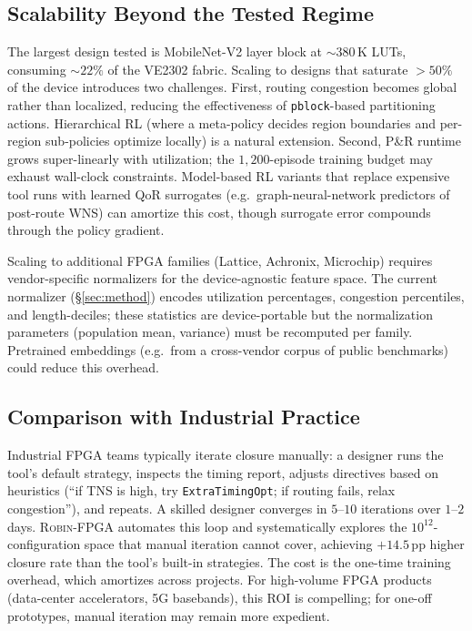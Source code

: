 \documentclass[journal,onecolumn=false]{IEEEtran}
\begin{document}
\subsection{Scalability Beyond the Tested Regime}

The largest design tested is MobileNet-V2 layer block at ${\sim}380$\,K LUTs, consuming ${\sim}22\%$ of the VE2302 fabric. Scaling to designs that saturate $>50\%$ of the device introduces two challenges. First, routing congestion becomes global rather than localized, reducing the effectiveness of \texttt{pblock}-based partitioning actions. Hierarchical RL (where a meta-policy decides region boundaries and per-region sub-policies optimize locally) is a natural extension. Second, P\&R runtime grows super-linearly with utilization; the $1{,}200$-episode training budget may exhaust wall-clock constraints. Model-based RL variants that replace expensive tool runs with learned QoR surrogates (e.g.\ graph-neural-network predictors of post-route WNS) can amortize this cost, though surrogate error compounds through the policy gradient.

Scaling to additional FPGA families (Lattice, Achronix, Microchip) requires vendor-specific normalizers for the device-agnostic feature space. The current normalizer (\S\ref{sec:method}) encodes utilization percentages, congestion percentiles, and length-deciles; these statistics are device-portable but the normalization parameters (population mean, variance) must be recomputed per family. Pretrained embeddings (e.g.\ from a cross-vendor corpus of public benchmarks) could reduce this overhead.

\subsection{Comparison with Industrial Practice}

Industrial FPGA teams typically iterate closure manually: a designer runs the tool's default strategy, inspects the timing report, adjusts directives based on heuristics (``if TNS is high, try \texttt{ExtraTimingOpt}; if routing fails, relax congestion''), and repeats. A skilled designer converges in $5$--$10$ iterations over $1$--$2$ days. \textsc{Robin-FPGA} automates this loop and systematically explores the $10^{12}$-configuration space that manual iteration cannot cover, achieving $+14.5$\,pp higher closure rate than the tool's built-in strategies. The cost is the one-time training overhead, which amortizes across projects. For high-volume FPGA products (data-center accelerators, 5G basebands), this ROI is compelling; for one-off prototypes, manual iteration may remain more expedient.
\end{document}
